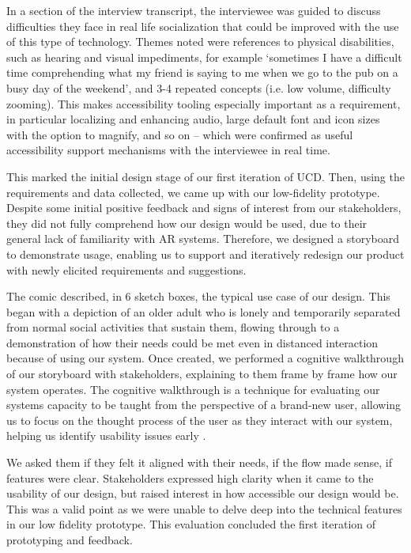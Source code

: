 \documentclass[12pt,a4paper]{article}
\begin{document}
In a section of the interview transcript, the interviewee was guided to discuss difficulties they face in real life socialization that could be improved with the use of this type of technology. Themes noted were references to physical disabilities, such as hearing and visual impediments, for example ‘sometimes I have a difficult time comprehending what my friend is saying to me when we go to the pub on a busy day of the weekend’, and 3-4 repeated concepts (i.e. low volume, difficulty zooming). This makes accessibility tooling especially important as a requirement, in particular localizing and enhancing audio, large default font and icon sizes with the option to magnify, and so on – which were confirmed as useful accessibility support mechanisms with the interviewee in real time. 

This marked the initial design stage of our first iteration of UCD. Then, using the requirements and data collected, we came up with our low-fidelity prototype. Despite some initial positive feedback and signs of interest from our stakeholders, they did not fully comprehend how our design would be used, due to their general lack of familiarity with AR systems. Therefore, we designed a storyboard to demonstrate usage, enabling us to support and iteratively redesign our product with newly elicited requirements and suggestions. 
 
The comic described, in 6 sketch boxes, the typical use case of our design. This began with a depiction of an older adult who is lonely and temporarily separated from normal social activities that sustain them, flowing through to a demonstration of how their needs could be met even in distanced interaction because of using our system. Once created, we performed a cognitive walkthrough of our storyboard with stakeholders, explaining to them frame by frame how our system operates. The cognitive walkthrough is a technique for evaluating our systems capacity to be taught from the perspective of a brand-new user, allowing us to focus on the thought process of the user as they interact with our system, helping us identify usability issues early \cite{Concept2023}. 

We asked them if they felt it aligned with their needs, if the flow made sense, if features were clear. Stakeholders expressed high clarity when it came to the usability of our design, but raised interest in how accessible our design would be. This was a valid point as we were unable to delve deep into the technical features in our low fidelity prototype. This evaluation concluded the first iteration of prototyping and feedback.  
\end{document}
